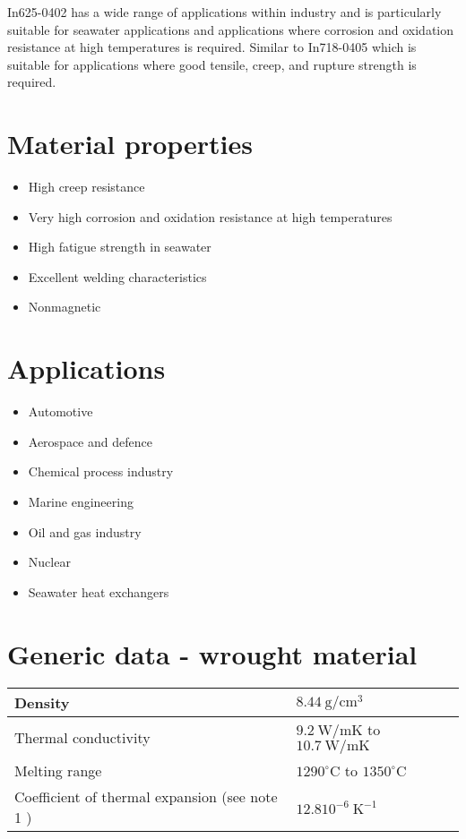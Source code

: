 \documentclass[10pt]{article}
\begin{document}
In625-0402 has a wide range of applications within industry and is particularly suitable for seawater applications and applications where corrosion and oxidation resistance at high temperatures is required. Similar to In718-0405 which is suitable for applications where good tensile, creep, and rupture strength is required.

\section*{Material properties}
\begin{itemize}
  \item High creep resistance

  \item Very high corrosion and oxidation resistance at high temperatures

  \item High fatigue strength in seawater

  \item Excellent welding characteristics

  \item Nonmagnetic

\end{itemize}

\section*{Applications}
\begin{itemize}
  \item Automotive

  \item Aerospace and defence

  \item Chemical process industry

  \item Marine engineering

  \item Oil and gas industry

  \item Nuclear

  \item Seawater heat exchangers

\end{itemize}

\section*{Generic data - wrought material}
\begin{center}
\begin{tabular}{|l|l|}
\hline
Density & $8.44 \mathrm{~g} / \mathrm{cm}^{3}$ \\
\hline
Thermal conductivity & $9.2 \mathrm{~W} / \mathrm{mK}$ to $10.7 \mathrm{~W} / \mathrm{mK}$ \\
\hline
Melting range & $1290^{\circ} \mathrm{C}$ to $1350^{\circ} \mathrm{C}$ \\
\hline
Coefficient of thermal expansion (see note 1 ) & $12.810^{-6} \mathrm{~K}^{-1}$ \\
\hline
\end{tabular}
\end{center}
\end{document}
